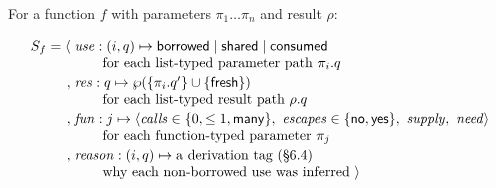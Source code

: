 
For a function $f$ with parameters $\pi _{1}\ldots \pi _{n}$ and result $\rho$:

\begin{equation*}
\begin{array}{@{}r@{\;}l@{}}
S_f = \langle & \mathit{use} : (i, q) \mapsto \mathsf{borrowed} \mid \mathsf{shared} \mid \mathsf{consumed}\\
 & \qquad\text{for each list-typed parameter path } \pi_i.q\\[2pt]
 , & \mathit{res} : q \mapsto \wp(\{\pi_i.q'\} \cup \{\mathsf{fresh}\})\\
 & \qquad\text{for each list-typed result path } \rho.q\\[2pt]
 , & \mathit{fun} : j \mapsto \langle \mathit{calls} \in \{0, \le 1, \mathsf{many}\},\ \mathit{escapes} \in \{\mathsf{no}, \mathsf{yes}\},\ \mathit{supply},\ \mathit{need} \rangle\\
 & \qquad\text{for each function-typed parameter } \pi_j\\[2pt]
 , & \mathit{reason} : (i, q) \mapsto \text{a derivation tag (§6.4)}\\
 & \qquad\text{why each non-borrowed use was inferred}\ \rangle
\end{array}
\end{equation*}

